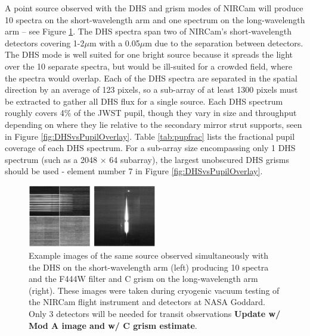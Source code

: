 \documentclass[iop]{emulateapj}
\begin{document}
A point source observed with the DHS and grism modes of NIRCam will produce 10 spectra on the short-wavelength arm and one spectrum on the long-wavelength arm -- see Figure \ref{fig:DHSimage}.
The DHS spectra span two of NIRCam's short-wavelength detectors covering 1-2$\mu$m with a 0.05$\mu$m due to the separation between detectors.
The DHS mode is well suited for one bright source because it spreads the light over the 10 separate spectra, but would be ill-suited for a crowded field, where the spectra would overlap.
Each of the DHS spectra are separated in the spatial direction by an average of 123 pixels, so a sub-array of at least 1300 pixels must be extracted to gather all DHS flux for a single source.
Each DHS spectrum roughly covers 4\% of the JWST pupil, though they vary in size and throughput depending on where they lie relative to the secondary mirror strut supports, seen in Figure \ref{fig:DHSvsPupilOverlay}.
Table \ref{tab:pupfrac} lists the fractional pupil coverage of each DHS spectrum.
For a sub-array size encompassing only 1 DHS spectrum (such as a 2048 $\times$ 64 subarray), the largest unobscured DHS grisms should be used - element number 7 in Figure \ref{fig:DHSvsPupilOverlay}.

\begin{figure}[!ht]
\includegraphics[width=0.5\textwidth]{dhs_image_example.png}
\caption{Example images of the same source observed simultaneously with the DHS on the short-wavelength arm (left) producing 10 spectra and the F444W filter and C grism on the long-wavelength arm (right).
These images were taken during cryogenic vacuum testing of the NIRCam flight instrument and detectors at NASA Goddard.
Only 3 detectors will be needed for transit observations \textbf{Update w/ Mod A image and w/ C grism estimate}.}\label{fig:DHSimage}
\end{figure}
\end{document}
